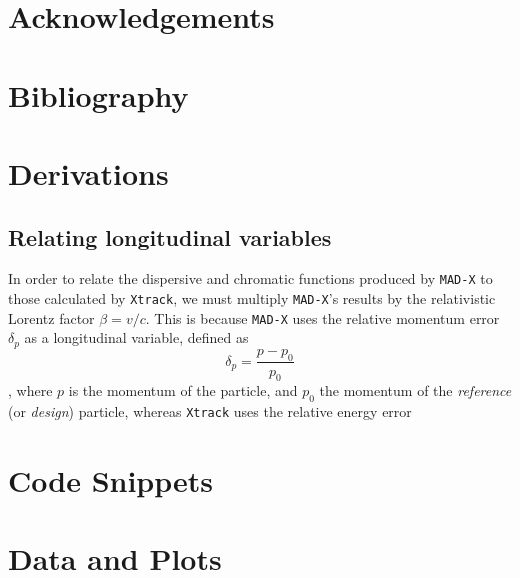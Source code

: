 \documentclass[11pt]{report}
\begin{document}
\chapter{Acknowledgements}

\chapter{Bibliography}

\nocite{*}

\begin{appendices}

\chapter{Derivations}

\section{Relating longitudinal variables}

In order to relate the dispersive and chromatic functions produced by \verb|MAD-X| to those calculated by \verb|Xtrack|, we must multiply \verb|MAD-X|'s results by the relativistic Lorentz factor $\beta=v/c$. This is because \verb|MAD-X| uses the relative momentum error $\delta_p$ as a longitudinal variable, defined as
\begin{equation}
\delta_p=\frac{p-p_0}{p_0}
\end{equation}, where $p$ is the momentum of the particle, and $p_0$ the momentum of the {\it reference} (or {\it design}) particle, whereas \verb|Xtrack| uses the relative energy error

\chapter{Code Snippets}

\chapter{Data and Plots}

\end{appendices}
\end{document}
